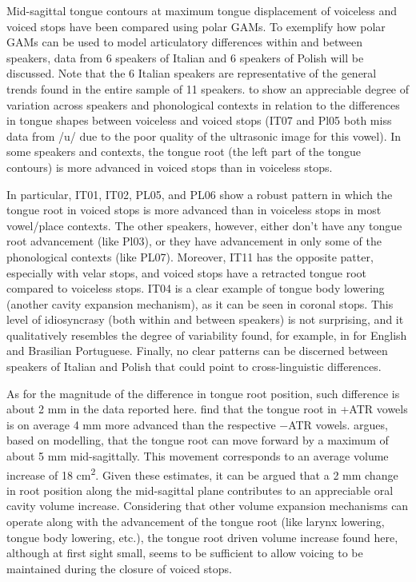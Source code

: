 \documentclass[12pt,]{article}
\begin{document}
Mid-sagittal tongue contours at maximum tongue displacement of voiceless
and voiced stops have been compared using polar GAMs. To exemplify how
polar GAMs can be used to model articulatory differences within and
between speakers, data from 6 speakers of Italian and 6 speakers of
Polish will be discussed. Note that the 6 Italian speakers are
representative of the general trends found in the entire sample of 11
speakers.  to  show an
appreciable degree of variation across speakers and phonological
contexts in relation to the differences in tongue shapes between
voiceless and voiced stops (IT07 and Pl05 both miss data from /u/ due to
the poor quality of the ultrasonic image for this vowel). In some
speakers and contexts, the tongue root (the left part of the tongue
contours) is more advanced in voiced stops than in voiceless stops.

In particular, IT01, IT02, PL05, and PL06 show a robust pattern in which
the tongue root in voiced stops is more advanced than in voiceless stops
in most vowel/place contexts. The other speakers, however, either don't
have any tongue root advancement (like Pl03), or they have advancement
in only some of the phonological contexts (like PL07). Moreover, IT11
has the opposite patter, especially with velar stops, and voiced stops
have a retracted tongue root compared to voiceless stops. IT04 is a
clear example of tongue body lowering (another cavity expansion
mechanism), as it can be seen in coronal stops. This level of
idiosyncrasy (both within and between speakers) is not surprising, and
it qualitatively resembles the degree of variability found, for example,
in \citet{ahn2018} for English and Brasilian Portuguese. Finally, no
clear patterns can be discerned between speakers of Italian and Polish
that could point to cross-linguistic differences.

As for the magnitude of the difference in tongue root position, such
difference is about 2 mm in the data reported here. \citet{kirkham2017}
find that the tongue root in +ATR vowels is on average 4 mm more
advanced than the respective −ATR vowels. \citet{rothenberg1967} argues,
based on modelling, that the tongue root can move forward by a maximum
of about 5 mm mid-sagittally. This movement corresponds to an average
volume increase of 18 cm\textsuperscript{2}. Given these estimates, it
can be argued that a 2 mm change in root position along the mid-sagittal
plane contributes to an appreciable oral cavity volume increase.
Considering that other volume expansion mechanisms can operate along
with the advancement of the tongue root (like larynx lowering, tongue
body lowering, etc.), the tongue root driven volume increase found here,
although at first sight small, seems to be sufficient to allow voicing
to be maintained during the closure of voiced stops.
\end{document}
